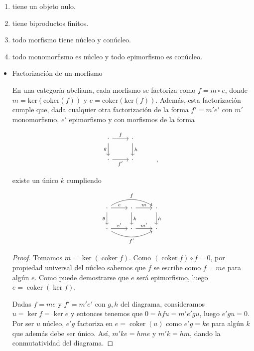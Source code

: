 \documentclass[11pt]{article}
\begin{document}
\begin{itemize}
\begin{definition}
\begin{enumerate}
\item tiene un objeto nulo.
\item tiene biproductos finitos.
\item todo morfismo tiene núcleo y conúcleo.
\item todo monomorfismo es núcleo y todo epimorfismo es conúcleo.
\end{enumerate}
\end{definition}

\begin{itemize}
\item Factorización de un morfismo
\label{sec-7-5-4-4-1}
\begin{proposition}
En una categoría abeliana, cada morfismo se factoriza como $f = m\circ e$,
donde $m = \mathrm{ker}(\mathrm{coker}(f))$ y $e = \mathrm{coker}(\mathrm{ker}(f))$. 
Además, esta factorización cumple que, dada cualquier otra factorización
de la forma $f' = m'e'$ con $m'$ monomorfismo, $e'$ epimorfismo y con morfismos
de la forma

\[\begin{tikzcd}
\cdot \rar{f}\dar[swap]{g} & \cdot \dar{h} \\
\cdot \rar[swap]{f'} & \cdot &,
\end{tikzcd}\]

existe un único $k$ cumpliendo

\[\begin{tikzcd}
\cdot \arrow[bend left]{rr}{f}\dar[swap]{g} \rar{e}& 
\cdot\rar{m}\dar{k} & \cdot \dar{h} \\
\cdot \arrow[bend right,swap]{rr}{f'} \rar{e'} & \cdot\rar{m'} & \cdot
\end{tikzcd}\]
\end{proposition}
\begin{proof}
Tomamos $m = \ker(\operatorname{coker} f)$. Como $(\operatorname{coker} f)\circ f = 0$, por propiedad universal
del núcleo sabemos que $f$ se escribe como $f = me$ para algún $e$. Como puede
demostrarse que $e$ será epimorfismo, luego $e = \operatorname{coker}(\ker f)$.

Dadas $f=me$ y $f'=m'e'$ con $g,h$ del diagrama, consideramos
$u = \ker f = \ker e$ y entonces tenemos que $0 = hfu = m'e'gu$, luego $e'gu = 0$.
Por ser $u$ núcleo, $e'g$ factoriza en $e = \operatorname{coker}(u)$ como $e'g = ke$ para algún
$k$ que además debe ser único. Así, $m'ke = hme$ y $m'k = hm$, dando la
conmutatividad del diagrama.
\end{proof}


\end{itemize}
\end{itemize}
\end{document}
